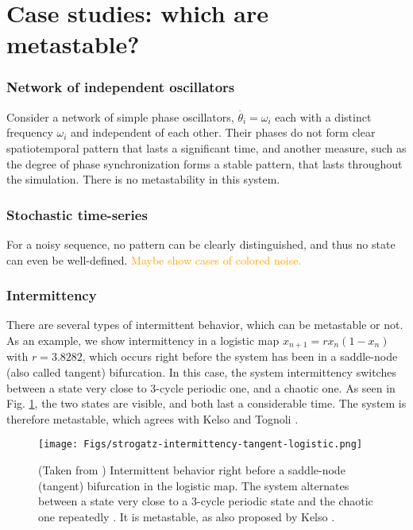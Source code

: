 \documentclass[preprint,superscriptaddress,showpacs,amsmath,amssymb,aps,pre,floatfix]{revtex4-1}
\theoremstyle{definition}
\begin{document}
\section{Case studies: which are metastable?}


\subsubsection{Network of independent oscillators}
Consider a network of simple phase oscillators, $\dot{\theta_i} = \omega_i$ each with a distinct frequency $\omega_i$ and independent of each other. Their phases do not form clear spatiotemporal pattern that lasts a significant time, and another measure, such as the degree of phase synchronization forms a stable pattern, that lasts throughout the simulation. There is no metastability in this system.

\subsubsection{Stochastic time-series}
For a noisy sequence, no pattern can be clearly distinguished, and thus no state can even be well-defined. \textcolor{orange}{Maybe show cases of colored noise.}

\subsubsection{Intermittency}
There are several types of intermittent behavior, which can be metastable or not. As an example, we show intermittency in a logistic map $x_{n+1} = r x_n (1 - x_n)$ with $r = 3.8282$, which occurs right before the system has been in a saddle-node (also called tangent) bifurcation. In this case, the system intermittency switches between a state very close to 3-cycle periodic one, and a chaotic one. As seen in Fig. \ref{fig:case-sninter}, the two states are visible, and both last a considerable time. The system is therefore metastable, which agrees with Kelso and Tognoli \cite{tognoli_2014, tognoli_2014a}.
%
\begin{figure}[H]
    \centering
    \texttt{[image: Figs/strogatz-intermittency-tangent-logistic.png]}
    \caption{(Taken from \cite{strogatz_2001}) Intermittent behavior right before a saddle-node (tangent) bifurcation in the logistic map. The system alternates between a state very close to a 3-cycle periodic state and the chaotic one repeatedly \cite{strogatz_2001}. It is metastable, as also proposed by Kelso \cite{tognoli_2014, tognoli_2014a}.}
    \label{fig:case-sninter}
\end{figure}
\end{document}
